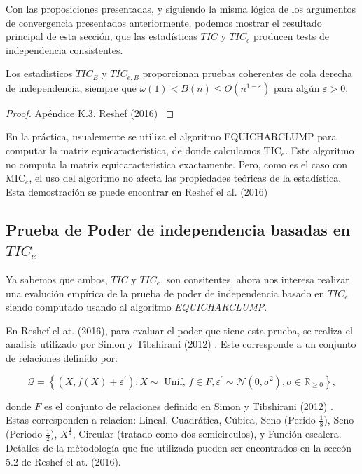 \begin{defn}
		Con las proposiciones presentadas, y siguiendo la misma l\'ogica de los argumentos de convergencia presentados anteriormente, podemos mostrar el resultado principal de esta secci\'on, que las estad\'isticas $TIC$ y $TIC_e$ producen tests de independencia consistentes.

		\begin{thm}
			Los estadisticos $T I C_B$ y $T I C_{e, B}$ proporcionan pruebas coherentes de cola derecha de independencia, siempre que $\omega(1)<B(n) \leq O\left(n^{1-\varepsilon}\right)$ para alg\'un $\varepsilon>0$.
		\end{thm}
		\begin{proof}
			Ap\'endice K.3. Reshef (2016) \cite{Reshef2016}
		\end{proof}

		En la pr\'actica, usualemente se utiliza el algoritmo  EQUICHARCLUMP \cite[Secci\'on 4.3]{Reshef2016} para computar la matriz equicaracter\'istica, de donde calculamos $\mathrm{TIC}_e$. Este algoritmo no computa la matriz equicaracteristica exactamente. Pero, como es el caso con $\mathrm{MIC}_e$, el uso del algoritmo no afecta las propiedades te\'oricas de la estad\'istica. Esta demostraci\'on se puede encontrar en Reshef el al. (2016) \cite[Ap\'endice H]{Reshef2016}
	\end{defn}

	\subsection[poder de independencia basado en TICe]{Prueba de Poder de independencia basadas en $TIC_e$}

	Ya sabemos que ambos, $TIC$ y $TIC_e$, son consitentes, ahora nos interesa realizar una evaluci\'on emp\'irica de la prueba de poder de independencia basado en $TIC_e$	siendo computado usando al algoritmo \textit{EQUICHARCLUMP}.

	En Reshef el at. (2016)\cite{Reshef2016}, para evaluar el poder que tiene esta prueba, se realiza el analisis utilizado por Simon y Tibshirani (2012) \cite{SimonTibshirani}. Este corresponde a un conjunto de relaciones definido por:

	$$
	\mathcal{Q}=\left\{\left(X, f(X)+\varepsilon^{\prime}\right): X \sim \text { Unif, } f \in F, \varepsilon^{\prime} \sim \mathcal{N}\left(0, \sigma^2\right), \sigma \in \mathbb{R}_{\geq 0}\right\},
	$$
	
	donde $F$ es el conjunto de relaciones definido en Simon y Tibshirani (2012) \cite{SimonTibshirani}. Estas corresponden a relacion: Lineal, Cuadr\'atica, C\'ubica, Seno (Perido $\frac{1}{8}$), Seno (Periodo $\frac{1}{2}$), $X^\frac{1}{4}$, Circular (tratado como dos semicirculos), y Funci\'on escalera. Detalles de la m\'etodolog\'ia que fue utilizada pueden ser encontrados en la secc\'on 5.2 de Reshef el at. (2016)\cite{Reshef2016}.


